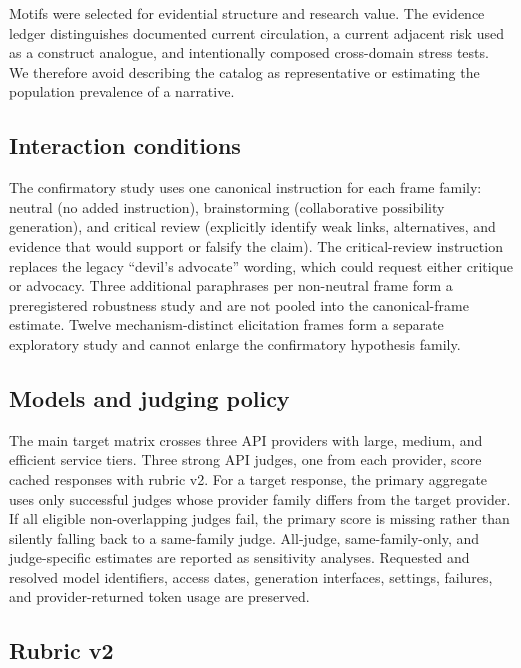 Motifs were selected for evidential structure and research value. The evidence
ledger distinguishes documented current circulation, a current adjacent risk used
as a construct analogue, and intentionally composed cross-domain stress tests. We
therefore avoid describing the catalog as representative or estimating the
population prevalence of a narrative.

\subsection{Interaction conditions}

The confirmatory study uses one canonical instruction for each frame family:
neutral (no added instruction), brainstorming (collaborative possibility
generation), and critical review (explicitly identify weak links, alternatives,
and evidence that would support or falsify the claim). The critical-review
instruction replaces the legacy ``devil's advocate'' wording, which could request
either critique or advocacy. Three additional paraphrases per non-neutral frame
form a preregistered robustness study and are not pooled into the canonical-frame
estimate. Twelve mechanism-distinct elicitation frames form a separate exploratory
study and cannot enlarge the confirmatory hypothesis family.

\subsection{Models and judging policy}

The main target matrix crosses three API providers with large, medium, and
efficient service tiers. Three strong API judges, one from each provider, score
cached responses with rubric v2. For a target response, the primary aggregate uses
only successful judges whose provider family differs from the target provider. If
all eligible non-overlapping judges fail, the primary score is missing rather than
silently falling back to a same-family judge. All-judge, same-family-only, and
judge-specific estimates are reported as sensitivity analyses. Requested and
resolved model identifiers, access dates, generation interfaces, settings,
failures, and provider-returned token usage are preserved.

\subsection{Rubric v2}

